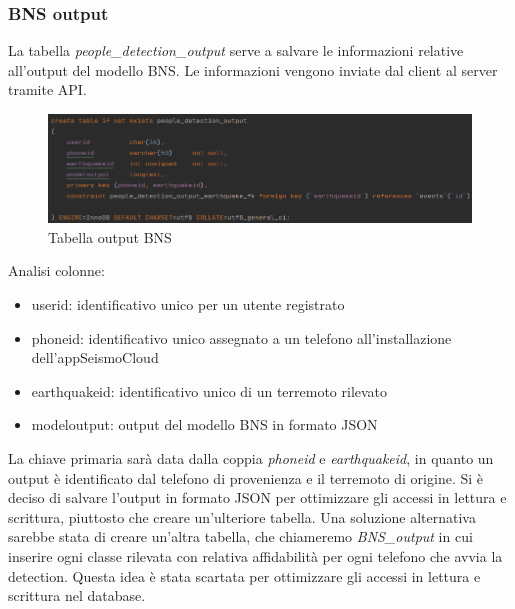 \documentclass[main.tex]{subfiles}
\begin{document}
\subsubsection{BNS output}
La tabella \emph{people\_detection\_output} serve a salvare le informazioni relative all'output del modello BNS. Le informazioni vengono inviate dal client al server tramite API.
\begin{figure}[H]
    \centering
    \includegraphics[width=1\linewidth]{img/Post-Earthquake/BNS-output.png}
    \caption{Tabella output BNS}
    \label{fig:BNS-table}
\end{figure}
Analisi colonne:
\begin{itemize}
    \item userid: identificativo unico per un utente registrato
    \item phoneid: identificativo unico assegnato a un telefono all'installazione dell'app\newline SeismoCloud
    \item earthquakeid: identificativo unico di un terremoto rilevato
    \item modeloutput: output del modello BNS in formato JSON
\end{itemize}
La chiave primaria sarà data dalla coppia \emph{phoneid} e \emph{earthquakeid}, in quanto un output è identificato dal telefono di provenienza e il terremoto di origine. \newline
Si è deciso di salvare l'output in formato JSON per ottimizzare gli accessi in lettura e scrittura, piuttosto che creare un'ulteriore tabella.\newline %
Una soluzione alternativa sarebbe stata di creare un'altra tabella, che chiameremo \emph{BNS\_output} in cui inserire ogni classe rilevata con relativa affidabilità per ogni telefono che avvia la detection. Questa idea è stata scartata per ottimizzare gli accessi in lettura e scrittura nel database.
\end{document}
